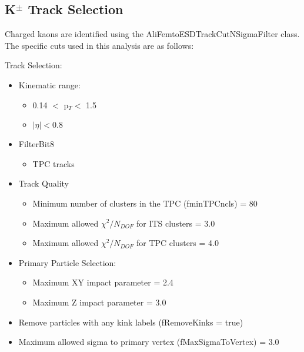 \documentclass[../AnalysisNoteJBuxton.tex]{subfiles}
\begin{document}
\subsection{\texorpdfstring{K$^{\pm}$}{TEXT} Track Selection}
\label{KchTrackSelection}

Charged kaons are identified using the AliFemtoESDTrackCutNSigmaFilter class.  The specific cuts used in this analysis are as follows:

 Track Selection:
 \begin{itemize}
  \itemsep0em
  \item Kinematic range:
  \begin{itemize}
   \itemsep0em
   \item 0.14 $<$ p$_{T} <$ 1.5
   \item $|\eta| < 0.8$
  \end{itemize}
  \item FilterBit8
  \begin{itemize}
   \item TPC tracks
  \end{itemize}
  \item Track Quality
  \begin{itemize}
   \item Minimum number of clusters in the TPC (fminTPCncls) = 80
   \item Maximum allowed $\chi^{2}/N_{DOF}$ for ITS clusters = 3.0
   \item Maximum allowed $\chi^{2}/N_{DOF}$ for TPC clusters = 4.0 
  \end{itemize}
  \item Primary Particle Selection:
  \begin{itemize} 
   \item Maximum XY impact parameter = 2.4
   \item Maximum Z impact parameter = 3.0
  \end{itemize} 
  \item Remove particles with any kink labels (fRemoveKinks = true)
  \item Maximum allowed sigma to primary vertex (fMaxSigmaToVertex) = 3.0
 \end{itemize} 
 
\end{document}
